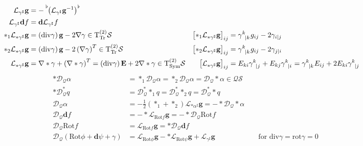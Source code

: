 \documentclass[a4paper,10pt]{scrartcl}
\newcommand{\surf}{\mathcal{S}}
\newcommand{\T}{\mathrm{T}}
\newcommand{\tpsprop}[2]{\T^{(#1)}_{#2}\surf}
\newcommand{\ttssym}{\tpsprop{2}{\mathrm{Sym}}}
\newcommand{\ttstrfree}{\tpsprop{2}{\mathrm{Tr}}}
\newcommand{\qts}{\mathcal{Q}\surf}
\newcommand{\exd}{\mathbf{d}}
\newcommand{\rot}{\mathrm{rot}}
\renewcommand{\div}{\mathrm{div}}
\newcommand{\Rot}{\mathrm{Rot}}
\newcommand{\lie}{\mathcal{L}}
\newcommand{\dq}{\mathcal{D}_{\mathcal{Q}}}
\newcommand{\gb}{\mathbf{g}}
\newcommand{\Eb}{\mathbf{E}}
\begin{document}
  \begin{align*}
    \lie_{\gamma^{\sharp}}\gb &= -\tensor[^{\flat}]{\left( \lie_{\gamma^{\sharp}}\gb^{-1} \right)}{^{\flat}} \\
    \lie_{\gamma^{\sharp}}\exd f &= \exd\lie_{\gamma^{\sharp}}f\\
    *_{1}\lie_{*\gamma^{\sharp}}\gb &= \left(\div\gamma\right)\gb - 2\nabla\gamma \in \ttstrfree
              &\left[ *_{1}\lie_{*\gamma^{\sharp}}\gb \right]_{ij} &= \tensor{\gamma}{^{k}_{|k}}g_{ij} - 2\gamma_{i|j}\\
    *_{2}\lie_{*\gamma^{\sharp}}\gb &= \left(\div\gamma\right)\gb - 2\left(\nabla\gamma\right)^{T} \in \ttstrfree
              &\left[ *_{2}\lie_{*\gamma^{\sharp}}\gb \right]_{ij} &= \tensor{\gamma}{^{k}_{|k}}g_{ij} - 2\gamma_{j|i}\\
    \lie_{*\gamma^{\sharp}}\gb &=\nabla * \gamma + \left( \nabla * \gamma \right)^{T} = \left(\div\gamma\right)\Eb + 2\nabla * \gamma \in \ttssym
              &\left[ \lie_{*\gamma^{\sharp}}\gb \right]_{ij} 
                    &=  E_{ki}\tensor{\gamma}{^{k}_{|j}} + E_{kj}\tensor{\gamma}{^{k}_{|i}}
                     =  \tensor{\gamma}{^{k}_{|k}}E_{ij} + 2 E_{ki}\tensor{\gamma}{^{k}_{|j}}
  \end{align*}
  \begin{align*}
    *\dq\alpha &= *_{1}\dq\alpha = *_{2}\dq\alpha = \dq*\alpha \in \qts \\
    *\dq^{*} q &= \dq^{*} *_{1} q =  \dq^{*} *_{2} q = \dq^{*} * q\\
    \dq\alpha &= -\frac{1}{2}\left( *_{1} + *_{2} \right)\lie_{*\alpha^{\sharp}}\gb = -*\dq*\alpha\\
    \dq\exd f &= -*\lie_{\Rot f}\gb = -*\dq\Rot f \\
    \dq\Rot f &= \lie_{\Rot f}\gb = *\dq\exd f\\
    \dq\left( \Rot \phi + \exd\psi + \gamma \right) &= \lie_{\Rot \phi}\gb - *\lie_{\Rot \psi}\gb + \lie_{\gamma^{\sharp}}\gb
              &&\text{ for }\div\gamma=\rot\gamma=0
  \end{align*}
\end{document}
